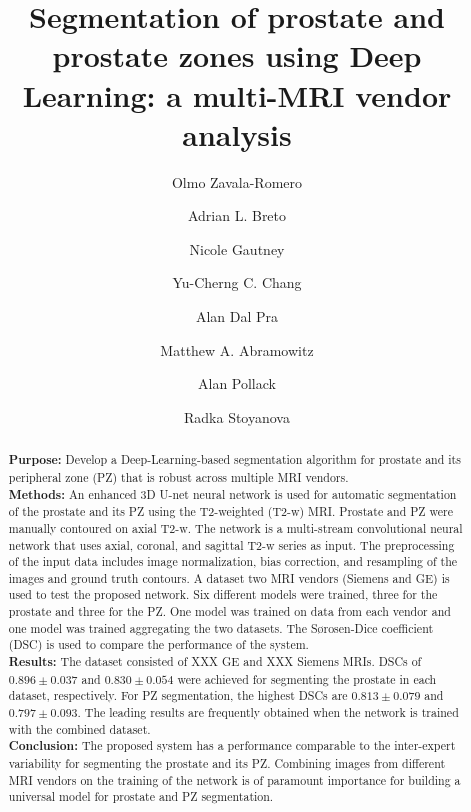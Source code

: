 \documentclass[num-refs]{wiley-article}
\title{ Segmentation of prostate and prostate zones using Deep Learning: a multi-MRI vendor analysis}
\author[1]{Olmo Zavala-Romero}
\author[1]{Adrian L. Breto }
\author[1]{Nicole Gautney}
\author[2]{Yu-Cherng C. Chang}
\author[1]{Alan Dal Pra}
\author[1]{Matthew A. Abramowitz}
\author[1]{Alan Pollack}
\author[1]{Radka Stoyanova}
\affil[1]{Department of Radiation Oncology, University of Miami Miller School of Medicine,
                Miami, FL, 33136, USA}
\affil[2]{University of Miami Miller School of Medicine,
                Miami, FL, 33136, USA}
\begin{document}
\maketitle

\begin{abstract} %
\textbf{Purpose:} Develop a Deep-Learning-based segmentation algorithm for prostate and its peripheral zone (PZ) that is robust across multiple MRI vendors. \\
\textbf{Methods:} An enhanced 3D U-net neural network is used for automatic segmentation of the prostate and its PZ using the T2-weighted (T2-w) MRI. Prostate and PZ were manually contoured on axial T2-w. The network is a multi-stream convolutional neural network that uses axial, coronal, and sagittal T2-w series as input. The preprocessing of the input data includes image normalization, bias correction, and resampling of the images and ground truth contours. A dataset two MRI vendors (Siemens and GE) is used to test the proposed network. Six different models were trained, three for the prostate and three for the PZ. One model was trained on  data from each vendor and one model was trained aggregating the two datasets. The S\o rosen-Dice coefficient (DSC) is used to compare the performance of the system. \\
\textbf{Results:} The dataset consisted of XXX GE and XXX Siemens MRIs. DSCs of $0.896 \pm 0.037$ and  $0.830 \pm 0.054$ were achieved for segmenting the prostate in each dataset, respectively. For PZ segmentation, the highest DSCs are $0.813 \pm 0.079$ and $0.797 \pm 0.093$. The leading results are frequently obtained when the network is trained with the combined dataset. \\
\textbf{Conclusion:} The proposed system has a performance comparable to the inter-expert variability for segmenting the prostate and its PZ. Combining images from different MRI vendors on the training of the network is of paramount importance for building a universal model for prostate and PZ segmentation. 
\end{abstract}




\end{document}
